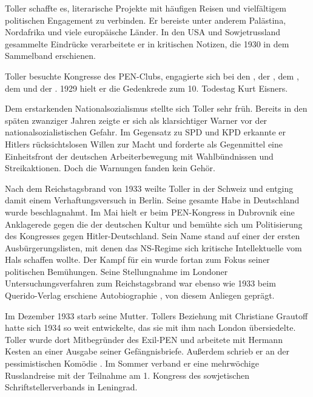 Toller schaffte es, literarische Projekte mit häufigen Reisen und vielfältigem
politischen Engagement zu verbinden. Er bereiste unter anderem Palästina,
Nordafrika und viele europäische Länder. In den USA und Sowjetrussland
gesammelte Eindrücke verarbeitete er in kritischen Notizen, die 1930 in dem
Sammelband \Cite{Quer durch} erschienen.

Toller besuchte Kongresse des PEN-Clubs, engagierte sich bei den
\Cite{Revolutionären Pazifisten}, der \Cite{Deutschen Liga für
Menschenrechte}, dem \Cite{Kongress gegen koloniale Unterdrückung}, dem
\Cite{Internationalen Komitee der Freunde Sowjetrusslands} und der
\Cite{Weltliga für Sexualreform}. 1929 hielt er die Gedenkrede zum
10. Todestag Kurt Eisners.

Dem erstarkenden Nationalsozialismus stellte sich Toller sehr früh.  Bereits
in den späten zwanziger Jahren zeigte er sich als klarsichtiger Warner vor
der nationalsozialistischen Gefahr. Im Gegensatz zu SPD und KPD erkannte er
Hitlers rücksichtslosen Willen zur Macht und forderte als Gegenmittel eine
Einheitsfront der deutschen Arbeiterbewegung mit Wahlbündnissen und
Streikaktionen. Doch die Warnungen fanden kein Gehör.


Nach dem Reichstagsbrand von 1933 weilte Toller in der Schweiz und entging
damit einem Verhaftungsversuch in Berlin. Seine gesamte Habe in Deutschland
wurde beschlagnahmt. Im Mai hielt er beim PEN-Kongress in Dubrovnik eine
Anklagerede gegen die \Cite{Gleichschaltung} der deutschen Kultur und bemühte
sich um Politisierung des Kongresses gegen Hitler-Deutschland.  Sein Name
stand auf einer der ersten Ausbürgerungslisten, mit denen das NS-Regime sich
kritische Intellektuelle vom Hals schaffen wollte. Der Kampf für ein
\Cite{anderes Deutschland} wurde fortan zum Fokus seiner politischen
Bemühungen. Seine Stellungnahme im Londoner Untersuchungsverfahren zum
Reichstagsbrand war ebenso wie 1933 beim Querido-Verlag erschiene
Autobiographie \Cite{Eine Jugend in Deutschland}, von diesem Anliegen geprägt.

Im Dezember 1933 starb seine Mutter. Tollers Beziehung mit Christiane Grautoff
hatte sich 1934 so weit entwickelte, das sie mit ihm nach London
übersiedelte. Toller wurde dort Mitbegründer des Exil-PEN und arbeitete mit
Hermann Kesten an einer Ausgabe seiner Gefängnisbriefe. Außerdem
schrieb er an der pessimistischen Komödie \Cite{No more Peace!}. Im Sommer
verband er eine mehrwöchige Russlandreise mit der Teilnahme am 1. Kongress des
sowjetischen Schriftstellerverbands in Leningrad.

